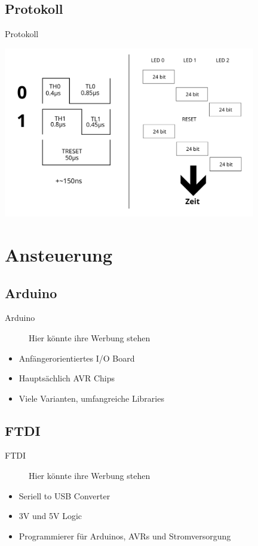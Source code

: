 \documentclass{beamer}
\begin{document}
\subsection{Protokoll}
\begin{frame}{Protokoll}
\begin{center}
 \includegraphics[width=11cm]{protokoll}
\end{center}
\end{frame}

\section{Ansteuerung}
\subsection{Arduino}
\begin{frame}{Arduino}
\begin{figure}[h]
 \centering
 Hier könnte ihre Werbung stehen
\end{figure}
\begin{itemize}
 \item Anfängerorientiertes I/O Board
 \item Hauptsächlich AVR Chips
 \item Viele Varianten, umfangreiche Libraries

\end{itemize}
\end{frame}

\subsection{FTDI}
\begin{frame}{FTDI}
\begin{figure}[h]
 \centering
 Hier könnte ihre Werbung stehen
\end{figure}
\begin{itemize}
 \item Seriell to USB Converter
 \item 3V und 5V Logic
 \item Programmierer für Arduinos, AVRs und Stromversorgung
\end{itemize}

\end{frame}
\end{document}
